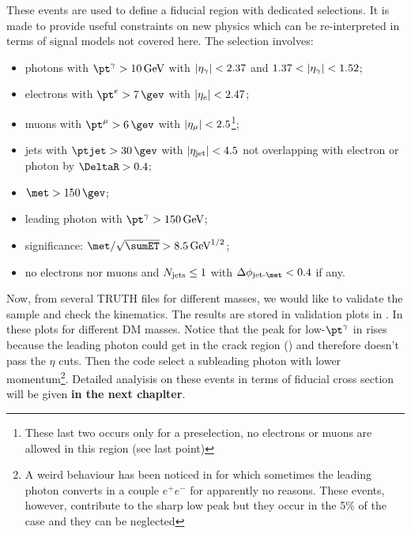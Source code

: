 These events are used to define a fiducial region with dedicated selections. It is made to provide useful constraints on new physics which can be re-interpreted in terms of signal models not covered here. The selection involves:
\begin{itemize}
\item photons with $\pt^\gamma>\SI{10}{\GeV}$ with $\lvert\eta_\gamma\rvert<2.37$ and $1.37<\lvert\eta_\gamma\rvert<1.52$;
\item electrons with $\pt^e>\SI{7}{\gev}$ with $\lvert\eta_e\rvert<2.47$;
\item muons with $\pt^\mu>\SI{6}{\gev}$ with $\lvert\eta_\mu\rvert<2.5$\footnote{These last two occurs only for a preselection, no electrons or muons are allowed in this region (see last point)};
\item jets with $\ptjet>\SI{30}{\gev}$ with $\lvert\eta_{\textup{jet}}\rvert<4.5$ not overlapping with electron or photon by $\DeltaR > 0.4$;
\item $\met>\SI{150}{\gev}$;
\item leading photon with $\pt^\gamma > \SI{150}{\GeV}$;
\item \met significance: $\met/\sqrt{\sumET} > \SI{8.5}{\GeV^{1/2}}$;
\item no electrons nor muons and $N_\textup{jets}\le 1$ with $\Delta\phi_\textup{jet-\met}<0.4$ if any.
\end{itemize}


Now, from several TRUTH files for different masses, we would like to validate the sample and check the kinematics. The results are stored in validation plots in \Fig{\ref{fig:validation}}. In these plots for different DM masses. Notice that the peak for low-$\pt^\gamma$ in \Fig{\ref{subfig:phpt}} rises because the leading photon could get in the crack region () and therefore doesn't pass the $\eta$ cuts. Then the code select a subleading photon with lower momentum\footnote{A weird behaviour has been noticed in \PYTHIA for which sometimes the leading photon converts in a couple $e^+e^-$ for apparently no reasons. These events, however, contribute to the sharp low peak but they occur in the 5\% of the case and they can be neglected}. Detailed analyisis on these events in terms of fiducial cross section will be given {\bfseries in the next chaplter}.


